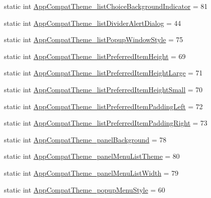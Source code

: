 \begin{DoxyCompactItemize}
static int \hyperlink{classandroid_1_1support_1_1v7_1_1cardview_1_1R_1_1styleable_ad2bb60a20b18a930a128f24c8459db7b}{App\+Compat\+Theme\+\_\+list\+Choice\+Background\+Indicator} = 81
\item 
static int \hyperlink{classandroid_1_1support_1_1v7_1_1cardview_1_1R_1_1styleable_a3b67d0da8fefb257707bd3d70e79ba96}{App\+Compat\+Theme\+\_\+list\+Divider\+Alert\+Dialog} = 44
\item 
static int \hyperlink{classandroid_1_1support_1_1v7_1_1cardview_1_1R_1_1styleable_a8c1f6899fdf824c15d7b6e5fb01901a3}{App\+Compat\+Theme\+\_\+list\+Popup\+Window\+Style} = 75
\item 
static int \hyperlink{classandroid_1_1support_1_1v7_1_1cardview_1_1R_1_1styleable_a619c201403d7a5bd57d8bba7b672369e}{App\+Compat\+Theme\+\_\+list\+Preferred\+Item\+Height} = 69
\item 
static int \hyperlink{classandroid_1_1support_1_1v7_1_1cardview_1_1R_1_1styleable_a54f8f73307e3dad436997279e7e73d17}{App\+Compat\+Theme\+\_\+list\+Preferred\+Item\+Height\+Large} = 71
\item 
static int \hyperlink{classandroid_1_1support_1_1v7_1_1cardview_1_1R_1_1styleable_a2edb3e97a83d754327dc42bd719ef9d4}{App\+Compat\+Theme\+\_\+list\+Preferred\+Item\+Height\+Small} = 70
\item 
static int \hyperlink{classandroid_1_1support_1_1v7_1_1cardview_1_1R_1_1styleable_ae88ee6cfa6fa7463687b22b65c5090eb}{App\+Compat\+Theme\+\_\+list\+Preferred\+Item\+Padding\+Left} = 72
\item 
static int \hyperlink{classandroid_1_1support_1_1v7_1_1cardview_1_1R_1_1styleable_a12084f5e81db166fdb702be49115eaf3}{App\+Compat\+Theme\+\_\+list\+Preferred\+Item\+Padding\+Right} = 73
\item 
static int \hyperlink{classandroid_1_1support_1_1v7_1_1cardview_1_1R_1_1styleable_a094e72d54827cbb597f966b9f78f4ef2}{App\+Compat\+Theme\+\_\+panel\+Background} = 78
\item 
static int \hyperlink{classandroid_1_1support_1_1v7_1_1cardview_1_1R_1_1styleable_a11a1d1569aae164daa489fb3f50bd2b6}{App\+Compat\+Theme\+\_\+panel\+Menu\+List\+Theme} = 80
\item 
static int \hyperlink{classandroid_1_1support_1_1v7_1_1cardview_1_1R_1_1styleable_a2f64ef2552f266f4bb03dd99b70b4aa3}{App\+Compat\+Theme\+\_\+panel\+Menu\+List\+Width} = 79
\item 
static int \hyperlink{classandroid_1_1support_1_1v7_1_1cardview_1_1R_1_1styleable_a1661ed867614a2bbfea7605ed5b8da7b}{App\+Compat\+Theme\+\_\+popup\+Menu\+Style} = 60

\end{DoxyCompactItemize}

